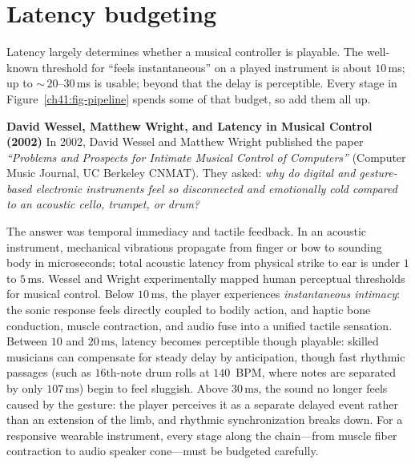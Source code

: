 \section{Latency budgeting}
\label{ch41:latency}

Latency largely determines whether a musical controller is playable. The well-known threshold for
``feels instantaneous'' on a played instrument is about $10\,$ms; up to
$\sim$\,$20$--$30\,$ms is usable; beyond that the delay is perceptible. Every
stage in Figure~\ref{ch41:fig-pipeline} spends some of that budget, so add them
all up.

\begin{historybox}
\textbf{David Wessel, Matthew Wright, and Latency in Musical Control (2002)}
In 2002, David Wessel and Matthew Wright published the paper \emph{``Problems and Prospects for Intimate Musical Control of Computers''} (Computer Music Journal, UC Berkeley CNMAT). They asked: \emph{why do digital and gesture-based electronic instruments feel so disconnected and emotionally cold compared to an acoustic cello, trumpet, or drum?}

The answer was temporal immediacy and tactile feedback. In an acoustic instrument, mechanical vibrations propagate from finger or bow to sounding body in microseconds; total acoustic latency from physical strike to ear is under $1$ to $5\,\text{ms}$. Wessel and Wright experimentally mapped human perceptual thresholds for musical control. Below $10\,\text{ms}$, the player experiences \emph{instantaneous intimacy}: the sonic response feels directly coupled to bodily action, and haptic bone conduction, muscle contraction, and audio fuse into a unified tactile sensation. Between $10$ and $20\,\text{ms}$, latency becomes perceptible though playable: skilled musicians can compensate for steady delay by anticipation, though fast rhythmic passages (such as $16\text{th}$-note drum rolls at $140$~BPM, where notes are separated by only $107\,\text{ms}$) begin to feel sluggish. Above $30\,\text{ms}$, the sound no longer feels caused by the gesture: the player perceives it as a separate delayed event rather than an extension of the limb, and rhythmic synchronization breaks down. For a responsive wearable instrument, every stage along the chain---from muscle fiber contraction to audio speaker cone---must be budgeted carefully.
\end{historybox}

